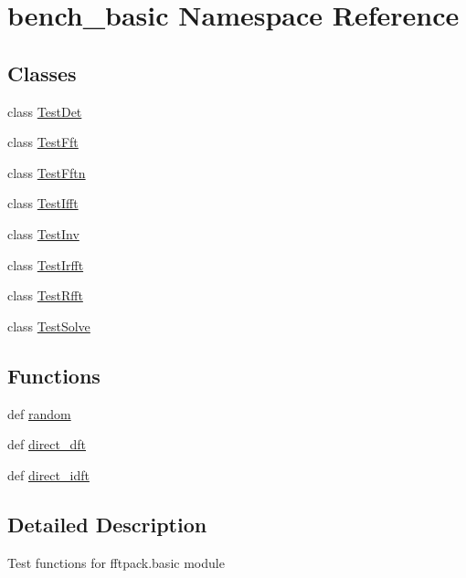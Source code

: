 \hypertarget{namespacebench__basic}{}\section{bench\+\_\+basic Namespace Reference}
\label{namespacebench__basic}
\subsection*{Classes}
\begin{DoxyCompactItemize}
\item 
class \hyperlink{classbench__basic_1_1TestDet}{Test\+Det}
\item 
class \hyperlink{classbench__basic_1_1TestFft}{Test\+Fft}
\item 
class \hyperlink{classbench__basic_1_1TestFftn}{Test\+Fftn}
\item 
class \hyperlink{classbench__basic_1_1TestIfft}{Test\+Ifft}
\item 
class \hyperlink{classbench__basic_1_1TestInv}{Test\+Inv}
\item 
class \hyperlink{classbench__basic_1_1TestIrfft}{Test\+Irfft}
\item 
class \hyperlink{classbench__basic_1_1TestRfft}{Test\+Rfft}
\item 
class \hyperlink{classbench__basic_1_1TestSolve}{Test\+Solve}
\end{DoxyCompactItemize}
\subsection*{Functions}
\begin{DoxyCompactItemize}
\item 
def \hyperlink{namespacebench__basic_ab201b318b66bb4fa9a1b239ad0651de3}{random}
\item 
def \hyperlink{namespacebench__basic_a7053d341fea7141cf2d7409181806c34}{direct\+\_\+dft}
\item 
def \hyperlink{namespacebench__basic_aea369305df039f39f54e2db01b681a82}{direct\+\_\+idft}
\end{DoxyCompactItemize}


\subsection{Detailed Description}
\begin{DoxyVerb}Test functions for fftpack.basic module
\end{DoxyVerb}
 

